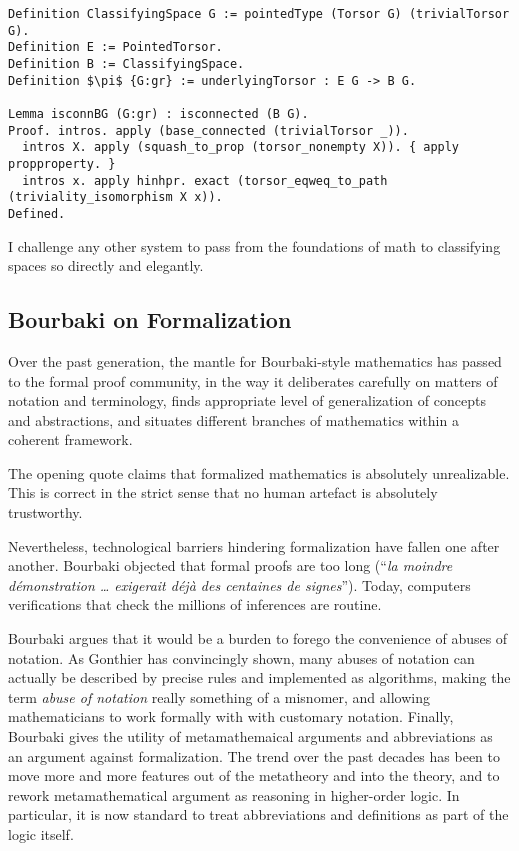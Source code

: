\documentclass[brochure,english,12pt]{bourbaki}
\theoremstyle{plain}
\begin{document}
\begin{lstlisting}[keepspaces=true,stringstyle=\tt,basicstyle=\small,frame=single,framesep=8pt,mathescape,morekeywords={Definition,Lemma,Proof,Defined},columns=flexible,caption={Construction of classifying spaces as the type of a torsor in Univalent foundations.  The proof that the classifying space $BG$ is connected. --D. Grayson.}]
Definition ClassifyingSpace G := pointedType (Torsor G) (trivialTorsor G).
Definition E := PointedTorsor.
Definition B := ClassifyingSpace.
Definition $\pi$ {G:gr} := underlyingTorsor : E G -> B G.

Lemma isconnBG (G:gr) : isconnected (B G).
Proof. intros. apply (base_connected (trivialTorsor _)).
  intros X. apply (squash_to_prop (torsor_nonempty X)). { apply propproperty. }
  intros x. apply hinhpr. exact (torsor_eqweq_to_path (triviality_isomorphism X x)). 
Defined.
\end{lstlisting}

I challenge any other system to pass from the foundations of math to classifying spaces so directly and elegantly.




\subsection{Bourbaki on Formalization}

Over the past generation, the mantle for Bourbaki-style mathematics has  passed to the formal proof community, in the way it
 deliberates carefully on matters of notation and terminology, finds
appropriate level of generalization of concepts and abstractions, and
situates different branches of mathematics within a coherent framework.

The opening quote claims that formalized mathematics is absolutely unrealizable.
This is correct in the strict sense that no human artefact is absolutely trustworthy.

Nevertheless,  technological barriers hindering formalization have fallen one
after another.  Bourbaki objected that formal proofs are too long (``{\it la moindre d\'emonstration \ldots
exigerait d\'ej\`a des centaines de signes}''). Today, computers verifications that
check the millions of inferences are routine.

Bourbaki argues that it would be a burden to forego the convenience of abuses of notation.
As Gonthier has convincingly shown, 
many abuses of notation can actually be described by precise rules and implemented as algorithms,
making the term {\it abuse of notation} really something of a misnomer, and
allowing mathematicians to work formally with with customary notation.
Finally, Bourbaki gives the utility of metamathemaical arguments and abbreviations as an argument against formalization.
The trend over the past decades has been to move more and more features out of the metatheory and into the theory, and to
rework metamathematical argument as reasoning in higher-order logic.  In particular, it is now
standard to treat abbreviations and definitions as part of the logic itself.
\end{document}
